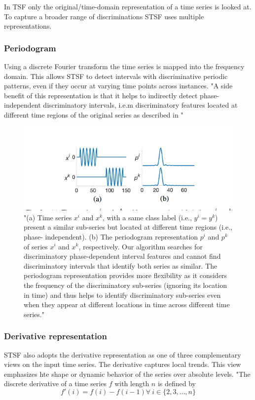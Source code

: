 
In TSF only the original/time-domain representation of a time series is looked at.
To capture a broader range of discriminations STSF uses multiple representations.
\subsubsection*{Periodogram}
Using a discrete Fourier transform the time series is mapped into the 
frequency domain. This allows STSF to detect intervals with discriminative periodic patterns,
even if they occur at varying time points across instances. "A side benefit of this 
representation is that it helps to indirectly detect phase-independent discriminatory intervals, i.e.m
discriminatory features located at different time regions of the original series as described in 
" 

\begin{figure}[h]
\centering
\includegraphics[width=\linewidth]{res/periobullshit.png}
\caption{"(a) Time series $x^i$ and $x^k$, with a same class label (i.e., $y^i = y^k$)
present a similar sub-series but located at different time regions (i.e., phase-
independent). (b) The periodogram representation $p^i$ and $p^k$ of series $x^i$ and
$x^k$, respectively. Our algorithm searches for discriminatory phase-dependent
interval features and cannot ﬁnd discriminatory intervals that identify both
series as similar. The periodogram representation provides more ﬂexibility
as it considers the frequency of the discriminatory sub-series (ignoring its
location in time) and thus helps to identify discriminatory sub-series even
when they appear at different locations in time across different time series."} %
\label{fig:perio}
\end{figure}
\subsubsection*{Derivative representation}
STSF also adopts the derivative representation as one of three complementary views 
on the input time series. The derivative captures local trends. This view emphasizes hte shape or dynamic behavior of the 
series over absolute levels. "The
discrete derivative of a time series $f$ with length $n$ is defined by
\[
	f'(i) = f(i) - f(i - 1) \forall ~ i \in \{2,3, \dots, n\}
\] %

